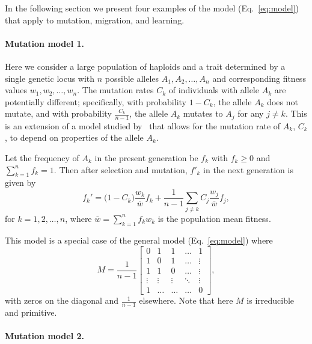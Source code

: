 \documentclass[12pt, twocolumn]{extarticle}
\begin{document}
In the following section we present four examples of the model (Eq.~\ref{eq:model}) that apply to mutation, migration, and learning.

\paragraph*{Mutation model 1.}\label{sec:mut_model_1}

Here we consider a large population of haploids and a trait determined by a single genetic locus with $n$ possible alleles $A_1, A_2, \ldots, A_n$ and corresponding fitness values $w_1, w_2, \ldots, w_n$.
The mutation rates $C_k$ of individuals with allele $A_k$ are potentially different;
specifically, with probability $1-C_k$, the allele $A_k$ does not mutate, and with probability $\frac{C_k}{n-1}$, the allele $A_k$ mutates to $A_j$ for any $j \ne k$.
This is an extension of a model studied by~\citet{Altenberg2017} that allows for the mutation rate of $A_k$, $C_k$, to depend on properties of the allele $A_k$.

Let the frequency of $A_k$ in the present generation be $f_k$ with $f_k \ge 0$ and $\sum_{k=1}^{n}{f_k}=1$.
Then after selection and mutation, $f'_k$ in the next generation is given by
\begin{equation}
f_k' = \big(1 - C_k\big) \frac{w_k}{\bar{w}} f_k + \frac{1}{n-1} \sum_{j \ne k}{C_j \frac{w_j}{\bar{w}} f_j},
\label{eq:mutation_model_1}
\end{equation}
for  $k=1, 2, \ldots, n$, where $\bar{w} = \sum_{k=1}^{n}{f_k w_k}$ is the population mean fitness.

This model is a special case of the general model (Eq.~\ref{eq:model}) where
\begin{equation} 
{M} = \frac{1}{n-1} \begin{bmatrix}
0 & 1 & 1 & \ldots & 1 \\
1 & 0 & 1 & \ldots & \vdots \\
1 & 1 & 0 & \ldots & \vdots \\
\vdots & \vdots & \vdots & \ddots & \vdots \\
1 & \ldots & \ldots & \ldots & 0
\end{bmatrix},
\end{equation}
with zeros on the diagonal and $\frac{1}{n-1}$ elsewhere.
Note that here ${M}$ is irreducible and primitive.

\paragraph*{Mutation model 2.}\label{sec:mut_model_2}
\end{document}
